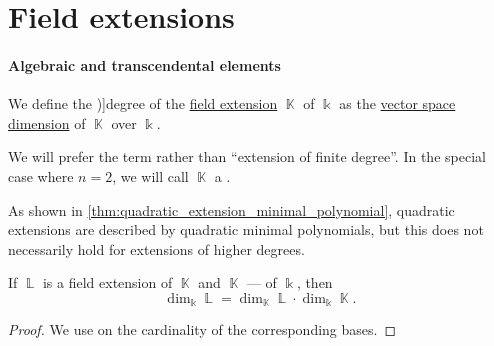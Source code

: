 \section{Field extensions}\label{sec:field_extensions}

\paragraph{Algebraic and transcendental elements}

\begin{definition}\label{def:field_extension_degree}
  We define the \term[ru=степень (def. \cite[9.5.1]{Винберг2014КурсАлгебры})]{degree} of the \hyperref[def:field/subobject]{field extension} \( \BbbK \) of \( \Bbbk \) as the \hyperref[thm:vector_space_dimension]{vector space dimension} of \( \BbbK \) over \( \Bbbk \).

  We will prefer the term  rather than \enquote{extension of finite degree}. In the special case where \( n = 2 \), we will call \( \BbbK \) a .
\end{definition}
\begin{comments}
  \item As shown in \cref{thm:quadratic_extension_minimal_polynomial}, quadratic extensions are described by quadratic minimal polynomials, but this does not necessarily hold for extensions of higher degrees.
\end{comments}

\begin{proposition}\label{thm:intermediate_field_extension_degree}
  If \( \BbbL \) is a field extension of \( \BbbK \) and \( \BbbK \) --- of \( \Bbbk \), then
  \begin{equation}\label{eq:thm:intermediate_field_extension_degree}
    \dim_\Bbbk \BbbL = \dim_\BbbK \BbbL \cdot \dim_\Bbbk \BbbK.
  \end{equation}
\end{proposition}
\begin{proof}
  We use  on the cardinality of the corresponding bases.
\end{proof}


